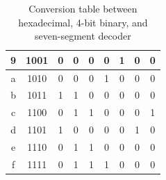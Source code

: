 \documentclass[12pt]{article}
\begin{document}
\begin{table}[h]
\begin{tabular}{ | c | c | c | c | c | c | c | c | c | }
  9                                                                      & 1001                                                                    & 0                             & 0                             & 0                             & 0                             & 1                             & 0                             & 0                             \\ \hline \rule{0em}{1.15em}
  a                                                                      & 1010                                                                    & 0                             & 0                             & 0                             & 1                             & 0                             & 0                             & 0                             \\ \hline \rule{0em}{1.15em}
  b                                                                      & 1011                                                                    & 1                             & 1                             & 0                             & 0                             & 0                             & 0                             & 0                             \\ \hline \rule{0em}{1.15em}
  c                                                                      & 1100                                                                    & 0                             & 1                             & 1                             & 0                             & 0                             & 0                             & 1                             \\ \hline \rule{0em}{1.15em}
  d                                                                      & 1101                                                                    & 1                             & 0                             & 0                             & 0                             & 0                             & 1                             & 0                             \\ \hline \rule{0em}{1.15em}
  e                                                                      & 1110                                                                    & 0                             & 1                             & 1                             & 0                             & 0                             & 0                             & 0                             \\ \hline \rule{0em}{1.15em}
  f                                                                      & 1111                                                                    & 0                             & 1                             & 1                             & 1                             & 0                             & 0                             & 0                             \\ \hline
  \end{tabular}
  \caption{Conversion table between hexadecimal, 4-bit binary, and seven-segment decoder}
  \label{table:1}
\end{table}
\end{document}
